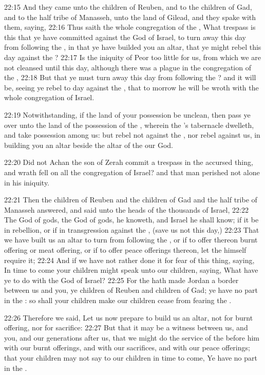 22:15 And they came unto the children of Reuben, and to the children of Gad, and to the half tribe of Manasseh, unto the land of Gilead, and they spake with them, saying, 22:16 Thus saith the whole congregation of the \LORD, What trespass is this that ye have committed against the God of Israel, to turn away this day from following the \LORD, in that ye have builded you an altar, that ye might rebel this day against the \LORD?  22:17 Is the iniquity of Peor too little for us, from which we are not cleansed until this day, although there was a plague in the congregation of the \LORD, 22:18 But that ye must turn away this day from following the \LORD? and it will be, seeing ye rebel to day against the \LORD, that to morrow he will be wroth with the whole congregation of Israel.

22:19 Notwithstanding, if the land of your possession be unclean, then pass ye over unto the land of the possession of the \LORD, wherein the \LORD's tabernacle dwelleth, and take possession among us: but rebel not against the \LORD, nor rebel against us, in building you an altar beside the altar of the \LORD our God.

22:20 Did not Achan the son of Zerah commit a trespass in the accursed thing, and wrath fell on all the congregation of Israel? and that man perished not alone in his iniquity.

22:21 Then the children of Reuben and the children of Gad and the half tribe of Manasseh answered, and said unto the heads of the thousands of Israel, 22:22 The \LORD God of gods, the \LORD God of gods, he knoweth, and Israel he shall know; if it be in rebellion, or if in transgression against the \LORD, (save us not this day,) 22:23 That we have built us an altar to turn from following the \LORD, or if to offer thereon burnt offering or meat offering, or if to offer peace offerings thereon, let the \LORD himself require it; 22:24 And if we have not rather done it for fear of this thing, saying, In time to come your children might speak unto our children, saying, What have ye to do with the \LORD God of Israel?  22:25 For the \LORD hath made Jordan a border between us and you, ye children of Reuben and children of Gad; ye have no part in the \LORD: so shall your children make our children cease from fearing the \LORD.

22:26 Therefore we said, Let us now prepare to build us an altar, not for burnt offering, nor for sacrifice: 22:27 But that it may be a witness between us, and you, and our generations after us, that we might do the service of the \LORD before him with our burnt offerings, and with our sacrifices, and with our peace offerings; that your children may not say to our children in time to come, Ye have no part in the \LORD.

